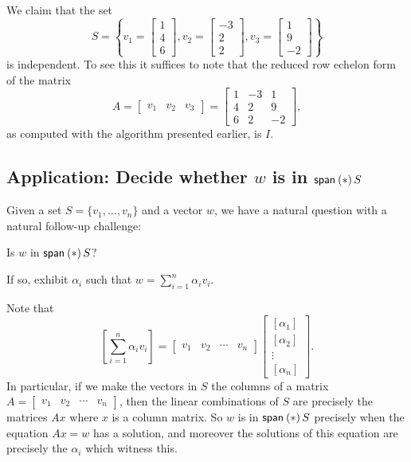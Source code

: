 \documentclass{memoir}
\begin{document}
We claim that the set \[ S = \left\{ v_1 = \begin{bmatrix} 1 \\ 4 \\ 6 \end{bmatrix}, v_2 = \begin{bmatrix} -3 \\ 2 \\ 2 \end{bmatrix}, v_3 = \begin{bmatrix} 1 \\ 9 \\ -2 \end{bmatrix} \right\} \] is independent. To see this it suffices to note that the reduced row echelon form of the matrix \[ A = \left[ \begin{array}{c|c|c} v_1 & v_2 & v_3 \end{array} \right] = \begin{bmatrix} 1 & -3 & 1 \\ 4 & 2 & 9 \\ 6 & 2 & -2 \end{bmatrix}, \] as computed with the algorithm presented earlier, is $I$.

\subsection*{Application: Decide whether $w$ is in $\operatorname{\mathsf{span}}_{}\left(*\right){S}$}

Given a set $S = \{v_1,\ldots,v_n\}$ and a vector $w$, we have a natural question with a natural follow-up challenge:
\begin{enumerate*}
\item Is $w$ in $\operatorname{\mathsf{span}}_{}\left(*\right){S}$?
\item If so, exhibit $\alpha_i$ such that $w = \sum_{i=1}^n \alpha_i v_i$.
\end{enumerate*}

Note that \[ \left[ \sum_{i=1}^n \alpha_i v_i \right] = \left[ \begin{array}{c|c|c|c} v_1 & v_2 & \cdots & v_n \end{array} \right] \left[ \begin{array}{c} [\alpha_1] \\ \hline [\alpha_2] \\ \hline \vdots \\ \hline [\alpha_n] \end{array} \right]. \] In particular, if we make the vectors in $S$ the columns of a matrix $A = \left[ \begin{array}{c|c|c|c} v_1 & v_2 & \cdots & v_n \end{array} \right]$, then the linear combinations of $S$ are precisely the matrices $Ax$ where $x$ is a column matrix. So $w$ is in $\operatorname{\mathsf{span}}_{}\left(*\right){S}$ precisely when the equation $Ax = w$ has a solution, and moreover the solutions of this equation are precisely the $\alpha_i$ which witness this.
\end{document}
